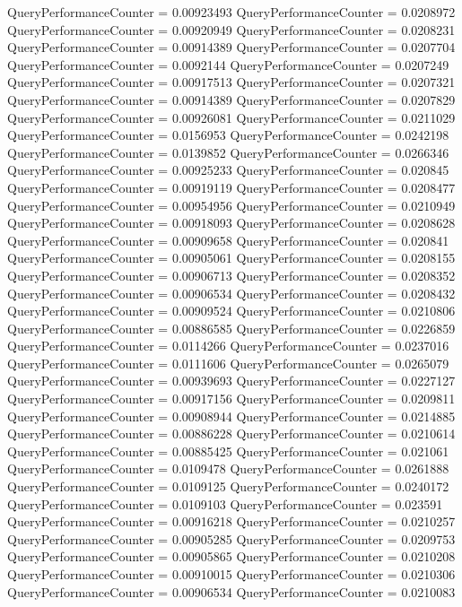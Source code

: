 \documentclass[9pt]{article}
\theoremstyle{plain}
\theoremstyle{definition}
\theoremstyle{remark}
\numberwithin{equation}{section}
\begin{document}
QueryPerformanceCounter  =  0.00923493
QueryPerformanceCounter  =  0.0208972
QueryPerformanceCounter  =  0.00920949
QueryPerformanceCounter  =  0.0208231
QueryPerformanceCounter  =  0.00914389
QueryPerformanceCounter  =  0.0207704
QueryPerformanceCounter  =  0.0092144
QueryPerformanceCounter  =  0.0207249
QueryPerformanceCounter  =  0.00917513
QueryPerformanceCounter  =  0.0207321
QueryPerformanceCounter  =  0.00914389
QueryPerformanceCounter  =  0.0207829
QueryPerformanceCounter  =  0.00926081
QueryPerformanceCounter  =  0.0211029
QueryPerformanceCounter  =  0.0156953
QueryPerformanceCounter  =  0.0242198
QueryPerformanceCounter  =  0.0139852
QueryPerformanceCounter  =  0.0266346
QueryPerformanceCounter  =  0.00925233
QueryPerformanceCounter  =  0.020845
QueryPerformanceCounter  =  0.00919119
QueryPerformanceCounter  =  0.0208477
QueryPerformanceCounter  =  0.00954956
QueryPerformanceCounter  =  0.0210949
QueryPerformanceCounter  =  0.00918093
QueryPerformanceCounter  =  0.0208628
QueryPerformanceCounter  =  0.00909658
QueryPerformanceCounter  =  0.020841
QueryPerformanceCounter  =  0.00905061
QueryPerformanceCounter  =  0.0208155
QueryPerformanceCounter  =  0.00906713
QueryPerformanceCounter  =  0.0208352
QueryPerformanceCounter  =  0.00906534
QueryPerformanceCounter  =  0.0208432
QueryPerformanceCounter  =  0.00909524
QueryPerformanceCounter  =  0.0210806
QueryPerformanceCounter  =  0.00886585
QueryPerformanceCounter  =  0.0226859
QueryPerformanceCounter  =  0.0114266
QueryPerformanceCounter  =  0.0237016
QueryPerformanceCounter  =  0.0111606
QueryPerformanceCounter  =  0.0265079
QueryPerformanceCounter  =  0.00939693
QueryPerformanceCounter  =  0.0227127
QueryPerformanceCounter  =  0.00917156
QueryPerformanceCounter  =  0.0209811
QueryPerformanceCounter  =  0.00908944
QueryPerformanceCounter  =  0.0214885
QueryPerformanceCounter  =  0.00886228
QueryPerformanceCounter  =  0.0210614
QueryPerformanceCounter  =  0.00885425
QueryPerformanceCounter  =  0.021061
QueryPerformanceCounter  =  0.0109478
QueryPerformanceCounter  =  0.0261888
QueryPerformanceCounter  =  0.0109125
QueryPerformanceCounter  =  0.0240172
QueryPerformanceCounter  =  0.0109103
QueryPerformanceCounter  =  0.023591
QueryPerformanceCounter  =  0.00916218
QueryPerformanceCounter  =  0.0210257
QueryPerformanceCounter  =  0.00905285
QueryPerformanceCounter  =  0.0209753
QueryPerformanceCounter  =  0.00905865
QueryPerformanceCounter  =  0.0210208
QueryPerformanceCounter  =  0.00910015
QueryPerformanceCounter  =  0.0210306
QueryPerformanceCounter  =  0.00906534
QueryPerformanceCounter  =  0.0210083
\end{document}

